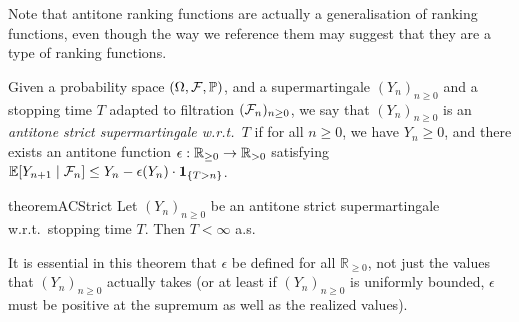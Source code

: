 Note that antitone ranking functions are actually a generalisation of ranking functions, even though the way we reference them may suggest that they are a type of ranking functions.

\iffalse
\lo{An aside: This CBV $\tY$-rule seems cleaner:
\[
\big(\tY f^{A \to B} \, x^A \, . \, \theta^B \big) \, v \to \theta[(\tY f \, x \, . \, \theta) / f, v / x].
\]
We assume $\tY f^{A \to B} \, x^A \, . \, \theta^B$ is a value.}
\fi

\begin{definition}
Given a probability space $(\Omega, \mathcal{F}, \mathbb{P})$, and a supermartingale $(Y_n)_{n \geq 0}$ and a stopping time $T$ adapted to filtration $(\mathcal{F}_n)_{n \geq 0}$,
we say that $(Y_n)_{n \geq 0}$ is an \emph{antitone strict supermartingale w.r.t.~$T$} if for all $n \geq 0$, we have $Y_n \geq 0$, and there exists an antitone function $\epsilon : \mathbb{R}_{{\geq}0} \to \mathbb{R}_{{>}0}$ satisfying
\(
\mathbb{E}[Y_{n+1} \mid \mathcal{F}_n] \leq Y_n - \epsilon (Y_n) \cdot {\bf 1}_{\{T > n\}}
\).
\end{definition}


\begin{restatable}{theorem}{ACStrict}
\label{thm:a-c strict}
Let $(Y_n)_{n \geq 0}$ be an antitone strict supermartingale w.r.t.~stopping time $T$. 
Then $T < \infty$ a.s.
\end{restatable}

It is essential in this theorem that $\epsilon$ be defined for all $\mathbb R_{\geq 0}$, not just the values that $(Y_n)_{n \geq 0}$ actually takes (or at least if $(Y_n)_{n \geq 0}$ is uniformly bounded, $\epsilon$ must be positive at the supremum as well as the realized values). 

